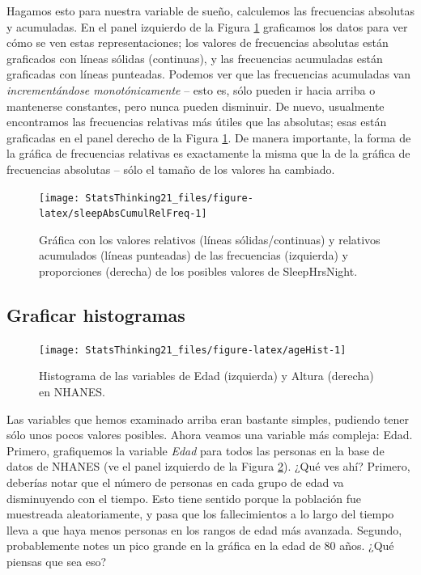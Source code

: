 \documentclass[
  12pt,
]{book}
\begin{document}
Hagamos esto para nuestra variable de sueño, calculemos las frecuencias absolutas y acumuladas. En el panel izquierdo de la Figura \ref{fig:sleepAbsCumulRelFreq} graficamos los datos para ver cómo se ven estas representaciones; los valores de frecuencias absolutas están graficados con líneas sólidas (continuas), y las frecuencias acumuladas están graficadas con líneas punteadas. Podemos ver que las frecuencias acumuladas van \emph{incrementándose monotónicamente} -- esto es, sólo pueden ir hacia arriba o mantenerse constantes, pero nunca pueden disminuir. De nuevo, usualmente encontramos las frecuencias relativas más útiles que las absolutas; esas están graficadas en el panel derecho de la Figura \ref{fig:sleepAbsCumulRelFreq}. De manera importante, la forma de la gráfica de frecuencias relativas es exactamente la misma que la de la gráfica de frecuencias absolutas -- sólo el tamaño de los valores ha cambiado.

\begin{figure}
\texttt{[image: StatsThinking21\_files/figure-latex/sleepAbsCumulRelFreq-1]} \caption{Gráfica con los valores relativos (líneas sólidas/continuas) y relativos acumulados (líneas punteadas) de las frecuencias (izquierda) y proporciones (derecha) de los posibles valores de SleepHrsNight.}\label{fig:sleepAbsCumulRelFreq}
\end{figure}

\hypertarget{plotting-histograms}{%
\subsection{Graficar histogramas}\label{plotting-histograms}}

\begin{figure}
\texttt{[image: StatsThinking21\_files/figure-latex/ageHist-1]} \caption{Histograma de las variables de Edad (izquierda) y Altura (derecha) en NHANES.}\label{fig:ageHist}
\end{figure}

Las variables que hemos examinado arriba eran bastante simples, pudiendo tener sólo unos pocos valores posibles. Ahora veamos una variable más compleja: Edad. Primero, grafiquemos la variable \emph{Edad} para todos las personas en la base de datos de NHANES (ve el panel izquierdo de la Figura \ref{fig:ageHist}). ¿Qué ves ahí? Primero, deberías notar que el número de personas en cada grupo de edad va disminuyendo con el tiempo. Esto tiene sentido porque la población fue muestreada aleatoriamente, y pasa que los fallecimientos a lo largo del tiempo lleva a que haya menos personas en los rangos de edad más avanzada. Segundo, probablemente notes un pico grande en la gráfica en la edad de 80 años. ¿Qué piensas que sea eso?
\end{document}
